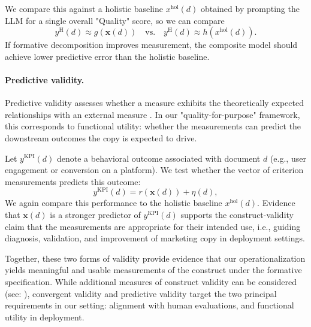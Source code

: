 We compare this against a holistic baseline $x^{\text{hol}}(d)$ obtained by prompting the LLM for a single overall "Quality" score, so we can compare 
\begin{equation}\label{eq:convergent_validity_holistic}
    y^{\text{H}}(d) \approx g(\mathbf{x}(d)) \quad \text{vs.} \quad y^{\text{H}}(d) \approx h(x^{\text{hol}}(d)).
\end{equation}
If formative decomposition improves measurement, the composite model should achieve lower predictive error than the holistic baseline.


\paragraph{Predictive validity.}
Predictive validity assesses whether a measure exhibits the theoretically expected relationships with an external measure \citep{messick_validity_1994}. In our "quality-for-purpose" framework, this corresponds to functional utility: whether the measurements can predict the downstream outcomes the copy is expected to drive.



Let $y^{\text{KPI}}(d)$ denote a behavioral outcome associated with document $d$ (e.g., user engagement or conversion on a platform). We test whether the vector of criterion measurements predicts this outcome:
\begin{equation}
    y^{\text{KPI}}(d) = r(\mathbf{x}(d)) + \eta(d),
\end{equation}
We again compare this performance to the holistic baseline $x^{\text{hol}}(d)$. Evidence that $\mathbf{x}(d)$ is a stronger predictor of $y^{\text{KPI}}(d)$ supports the construct-validity claim that the measurements are appropriate for their intended use, i.e., guiding diagnosis, validation, and improvement of marketing copy in deployment settings.

Together, these two forms of validity provide evidence that our operationalization yields meaningful and usable measurements of the construct under the formative specification. While additional measures of construct validity can be considered (see: \citet{lin_validity-guided_2025}), convergent validity and predictive validity target the two principal requirements in our setting: alignment with human evaluations, and functional utility in deployment. 




